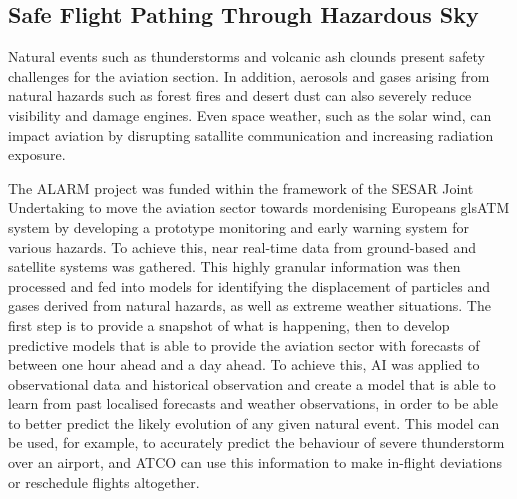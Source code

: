 \subsection{Safe Flight Pathing Through Hazardous Sky}

Natural events such as thunderstorms and volcanic ash clounds present safety challenges for the aviation section.
In addition, aerosols and gases arising from natural hazards such as forest fires and desert dust can also severely reduce visibility and damage engines.
Even space weather, such as the solar wind, can impact aviation by disrupting satallite communication and increasing radiation exposure.

The \gls{ALARM} project was funded within the framework of the \gls{SESAR} Joint Undertaking to move the aviation sector towards mordenising Europeans gls{ATM} system by developing a prototype monitoring and early warning system for various hazards.
To achieve this, near real-time data from ground-based and satellite systems was gathered. This highly granular information was then processed and fed into models for identifying the displacement of particles and gases derived from natural hazards, as well as extreme weather situations. 
The first step is to provide a snapshot of what is happening, then to develop predictive models that is able to provide the aviation sector with forecasts of between one hour ahead and a day ahead. 
To achieve this, \gls{AI} was applied to observational data and historical observation and create a model that is able to learn from past localised forecasts and weather observations, in order to be able to better predict the likely evolution of any given natural event.
This model can be used, for example, to accurately predict the behaviour of severe thunderstorm over an airport, and \gls{ATCO} can use this information to make in-flight deviations or reschedule flights altogether.

\cite{cordis2022aiatm}
